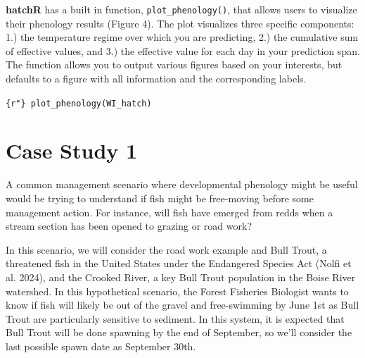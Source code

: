 \documentclass[webpdf,large,contemporary,namedate]{oup-authoring-template}
\theoremstyle{thmstyleone}
\theoremstyle{thmstyletwo}
\theoremstyle{thmstylethree}
\begin{document}
\textbf{hatchR} has a built in function, \texttt{plot\_phenology()},
that allows users to visualize their phenology results (Figure 4). The
plot visualizes three specific components: 1.) the temperature regime
over which you are predicting, 2.) the cumulative sum of effective
values, and 3.) the effective value for each day in your prediction
span. The function allows you to output various figures based on your
interests, but defaults to a figure with all information and the
corresponding labels.

\texttt{\{r"\}\ plot\_phenology(WI\_hatch)}

\section{Case Study 1}\label{case-study-1}

A common management scenario where developmental phenology might be
useful would be trying to understand if fish might be free-moving before
some management action. For instance, will fish have emerged from redds
when a stream section has been opened to grazing or road work?

In this scenario, we will consider the road work example and Bull Trout,
a threatened fish in the United States under the Endangered Species Act
(Nolfi et al. 2024), and the Crooked River, a key Bull Trout population
in the Boise River watershed. In this hypothetical scenario, the Forest
Fisheries Biologist wants to know if fish will likely be out of the
gravel and free-swimming by June 1st as Bull Trout are particularly
sensitive to sediment. In this system, it is expected that Bull Trout
will be done spawning by the end of September, so we'll consider the
last possible spawn date as September 30th.
\end{document}
